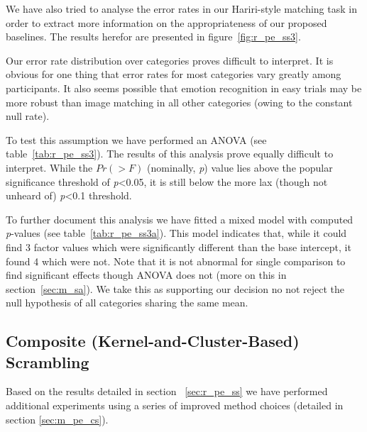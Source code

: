 	    We have also tried to analyse the error rates in our Hariri-style matching task in order to extract more information on the appropriateness of our proposed baselines.
	    The results herefor are presented in figure~\ref{fig:r_pe_ss3}.

	    Our error rate distribution over categories proves difficult to interpret.
	    It is obvious for one thing that error rates for most categories vary greatly among participants.
	    It also seems possible that emotion recognition in easy trials may be more robust than image matching in all other categories (owing to the constant null rate).
	    
	    To test this assumption we have performed an ANOVA (see table~\ref{tab:r_pe_ss3}).
	    The results of this analysis prove equally difficult to interpret. While the $Pr(>F)$ (nominally, \textit{p}) value lies above the popular significance threshold of \textit{p}<0.05, 
	    it is still below the more lax (though not unheard of) \textit{p}<0.1 threshold.
	    
	    To further document this analysis we have fitted a mixed model with computed \textit{p}-values (see table~\ref{tab:r_pe_ss3a}).
	    This model indicates that, while it could find 3 factor values which were significantly different than the base intercept, it found 4 which were not.
	    Note that it is not abnormal for single comparison to find significant effects though ANOVA does not (more on this in section~\ref{sec:m_sa}).
	    We take this as supporting our decision no not reject the null hypothesis of all categories sharing the same mean.
	\subsection{Composite (Kernel-and-Cluster-Based) Scrambling}\label{sec:r_pe_cs}
	    Based on the results detailed in section ~\ref{sec:r_pe_ss} we have performed additional experiments using a series of improved method choices (detailed in section \ref{sec:m_pe_cs}).
	    
